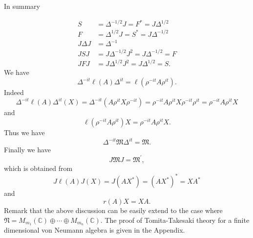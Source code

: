 In summary 

\begin{equation}
\begin{split}
S&=\Delta^{-1/2}J=F^\ast=J\Delta^{1/2}\\
F&=\Delta^{1/2}J=S^\ast=J\Delta^{-1/2}\\
J\Delta J&=\Delta^{-1}\\
JSJ&=J\Delta^{-1/2}J^2=J\Delta^{-1/2}=F\\
JFJ&=J\Delta^{1/2}J^2=J\Delta^{1/2}=S.
\end{split}
\end{equation}
We have 
$$
\Delta^{-it}\ell(A)\Delta^{it}=\ell(\rho^{-it}A\rho^{it}).
$$
Indeed $$\Delta^{-it}\ell(A)\Delta^{it}(X)=\Delta^{-it}(A\rho^{it}X\rho^{-it})=\rho^{-it}A\rho^{it}X\rho^{-it}\rho^{it}=\rho^{-it}A\rho^{it}X$$
and 
$$
\ell(\rho^{-it}A\rho^{it})X=\rho^{-it}A\rho^{it}X.
$$
Thus we have
$$
\Delta^{-it}\mathfrak{M}\Delta^{it}=\mathfrak{M}.
$$
     Finally we have 
       $$
          J\mathfrak{M}J=\mathfrak{M}^{\prime},
       $$
			 which is obtained from
			 $$
J\ell(A)J(X)=J(AX^\ast)=(AX^\ast)^\ast=XA^\ast
			 $$
			 and
			 $$
r(A)X=XA.
			 $$
Remark that the above discussion can be easily extend to the case where 
$\mathfrak{N}=M_{m_1}(\mathbb{C})\oplus \cdots \oplus M_{m_n}(\mathbb{C})$.
The proof of Tomita-Takesaki theory for a finite dimensional von Neumann algebra is given in the Appendix.
